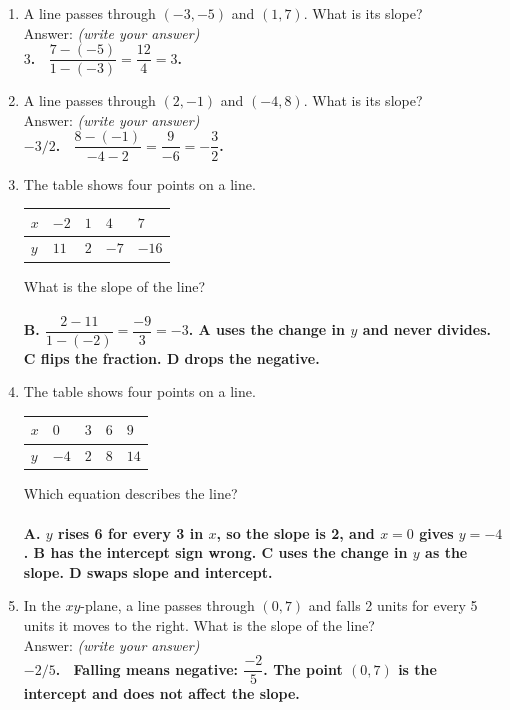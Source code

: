 \documentclass[11pt,a4paper]{article}
\newcommand{\spr}{\\[3pt]\hspace*{6pt}Answer: \underline{\hspace{3.2cm}}\hfill{\footnotesize\itshape(write your answer)}}
\newcommand{\ans}[1]{\ {\color{keyred}\bfseries #1}}
\newcommand{\ans}[1]{}
\begin{document}
\begin{enumerate}[leftmargin=20pt,itemsep=9pt]
\item A line passes through $(-3,-5)$ and $(1,7)$. What is its slope? \spr
  \ans{\\ $3$. \ $\dfrac{7-(-5)}{1-(-3)}=\dfrac{12}{4}=3$.}

\item A line passes through $(2,-1)$ and $(-4,8)$. What is its slope? \spr
  \ans{\\ $-3/2$. \ $\dfrac{8-(-1)}{-4-2}=\dfrac{9}{-6}=-\dfrac{3}{2}$.}

\item The table shows four points on a line.
  \begin{center}
  \begin{tabularx}{0.62\textwidth}{@{}|X|X|X|X|X|@{}}
  \hline
  $x$ & $-2$ & $1$ & $4$ & $7$\\ \hline
  $y$ & $11$ & $2$ & $-7$ & $-16$\\ \hline
  \end{tabularx}
  \end{center}
  What is the slope of the line?\\
  \ans{\\ B. $\dfrac{2-11}{1-(-2)}=\dfrac{-9}{3}=-3$. A uses the change in $y$ and never
  divides. C flips the fraction. D drops the negative.}

\item The table shows four points on a line.
  \begin{center}
  \begin{tabularx}{0.62\textwidth}{@{}|X|X|X|X|X|@{}}
  \hline
  $x$ & $0$ & $3$ & $6$ & $9$\\ \hline
  $y$ & $-4$ & $2$ & $8$ & $14$\\ \hline
  \end{tabularx}
  \end{center}
  Which equation describes the line?\\
  \ans{\\ A. $y$ rises 6 for every 3 in $x$, so the slope is 2, and $x=0$ gives $y=-4$.
  B has the intercept sign wrong. C uses the change in $y$ as the slope. D swaps slope
  and intercept.}

\item In the $xy$-plane, a line passes through $(0,7)$ and falls 2 units for every 5
  units it moves to the right. What is the slope of the line? \spr
  \ans{\\ $-2/5$. \ Falling means negative: $\dfrac{-2}{5}$. The point $(0,7)$ is the
  intercept and does not affect the slope.}


\end{enumerate}
\end{document}
